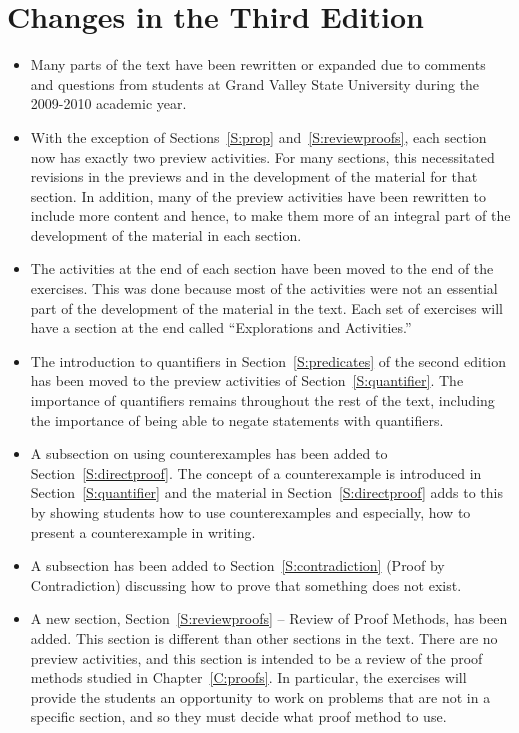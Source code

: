 \section*{Changes in the Third Edition}
\begin{itemize}
  \item Many parts of the text have been rewritten or expanded due to comments and questions from students at Grand Valley State University during the 2009-2010 academic year.
  \item With the exception of Sections~\ref{S:prop} and~\ref{S:reviewproofs}, each section now has exactly two preview activities.  For many sections, this necessitated revisions in the previews and in the development of the material for that section.  In addition, many of the preview activities have been rewritten to include more content and hence,  to make them more of an integral part of the development of the material in each section.  
  \item The activities at the end of each section have been moved to the end of the exercises.  This was done because most of the activities were not an essential part of the development of the material in the text.  Each set of exercises will have a section at the end called ``Explorations and Activities.''
  \item The introduction to quantifiers in Section~\ref{S:predicates} of the second edition has been moved to the preview activities of Section~\ref{S:quantifier}.  The importance of quantifiers remains throughout the rest of the text, including the importance of being able to negate statements with quantifiers.
  \item A subsection on using counterexamples has been added to Section~\ref{S:directproof}.  The concept of a counterexample is introduced in Section~\ref{S:quantifier} and the material in Section~\ref{S:directproof} adds to this by showing students how to use counterexamples and especially, how to present a counterexample in writing.
  \item A subsection has been added to Section~\ref{S:contradiction} (Proof by Contradiction) discussing how to prove that something does not exist.
  \item A new section, Section~\ref{S:reviewproofs} -- Review of Proof Methods, has been added.  This section is different than other sections in the text.  There are no preview activities, and this section is intended to be a review of the proof methods studied in Chapter~\ref{C:proofs}.  In particular, the exercises will provide the students an opportunity to work on problems that are not in a specific section, and so they must decide what proof method to use.

\end{itemize}
